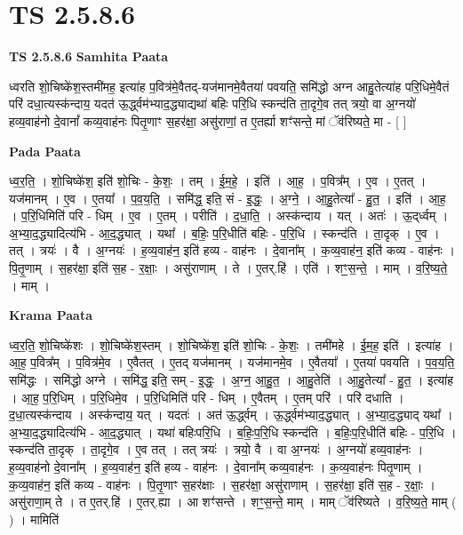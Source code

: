 \documentclass[17pt]{extarticle}
\begin{document}
\section*{ TS 2.5.8.6 }

\textbf{TS 2.5.8.6 } \newline
\textbf{Samhita Paata} \newline

ध्वरति शो॒चिष्के॑श॒स्तमी॑मह॒ इत्या॑ह प॒वित्र॑मे॒वैतद्-यज॑मानमे॒वैतया॑ पवयति॒ समि॑द्धो अग्न आहु॒तेत्या॑ह परि॒धिमे॒वैतं परि॑ दधा॒त्यस्क॑न्दाय॒ यदत॑ ऊ॒र्द्ध्वम॑भ्याद॒द्ध्याद्यथा॑ बहिः परि॒धि स्कन्द॑ति ता॒दृगे॒व तत् त्रयो॒ वा अ॒ग्नयो॑ हव्य॒वाह॑नो दे॒वानां᳚ कव्य॒वाह॑नः पितृ॒णाꣳ स॒हर॑क्षा॒ असु॑राणां॒ त ए॒तर्ह्या शꣳ॑सन्ते॒ मां ॅव॑रिष्यते॒ मा - [  ] \newline

\textbf{Pada Paata} \newline

ध्व॒र॒ति॒ । शो॒चिष्के॑श॒ इति॑ शो॒चिः - के॒शः॒ । तम् । ई॒म॒हे॒ । इति॑ । आ॒ह॒ । प॒वित्र᳚म् । ए॒व । ए॒तत् । यज॑मानम् । ए॒व । ए॒तया᳚ । प॒व॒य॒ति॒ । समि॑द्ध॒ इति॒ सं - इ॒द्धः॒ । अ॒ग्ने॒ । आ॒हु॒तेत्या᳚ - हु॒त॒ । इति॑ । आ॒ह॒ । प॒रि॒धिमिति॑ परि - धिम् । ए॒व । ए॒तम् । परीति॑ । द॒धा॒ति॒ । अस्क॑न्दाय । यत् । अतः॑ । ऊ॒द्‌र्ध्वम् । अ॒भ्या॒द॒द्ध्यादित्य॑भि - आ॒द॒द्ध्यात् । यथा᳚ । ब॒हिः॒ प॒रि॒धीति॑ बहिः - प॒रि॒धि । स्कन्द॑ति । ता॒दृक् । ए॒व । तत् । त्रयः॑ । वै । अ॒ग्नयः॑ । ह॒व्य॒वाह॑न॒ इति॑ हव्य - वाह॑नः । दे॒वाना᳚म् । क॒व्य॒वाह॑न॒ इति॑ कव्य - वाह॑नः । पि॒तृ॒णाम् । स॒हर॑क्षा॒ इति॑ स॒ह - र॒क्षाः॒ । असु॑राणाम् । ते । ए॒तर्.हि॑ । एति॑ । शꣳ॒॒स॒न्ते॒ । माम् । व॒रि॒ष्य॒ते॒ । माम् ।  \newline


\textbf{Krama Paata} \newline

ध्व॒र॒ति॒ शो॒चिष्के॑शः । शो॒चिष्के॑श॒स्तम् । शो॒चिष्के॑श॒ इति॑ शो॒चिः - के॒शः॒ । तमी॑महे । ई॒म॒ह॒ इति॑ । इत्या॑ह । आ॒ह॒ प॒वित्र᳚म् । प॒वित्र॑मे॒व । ए॒वैतत् । ए॒तद् यज॑मानम् । यज॑मानमे॒व । ए॒वैतया᳚ । ए॒तया॑ पवयति । प॒व॒य॒ति॒ समि॑द्धः । समि॑द्धो अग्ने । समि॑द्ध॒ इति॒ सम् - इ॒द्धः॒ । अ॒ग्न॒ आ॒हु॒त॒ । आ॒हु॒तेति॑ । आ॒हु॒तेत्या᳚ - हु॒त॒ । इत्या॑ह । आ॒ह॒ प॒रि॒धिम् । प॒रि॒धिमे॒व । प॒रि॒धिमिति॑ परि - धिम् । ए॒वैतम् । ए॒तम् परि॑ । परि॑ दधाति । द॒धा॒त्यस्क॑न्दाय । अस्क॑न्दाय॒ यत् । यदतः॑ । अत॑ ऊ॒र्द्ध्वम् । ऊ॒र्द्ध्वम॑भ्याद॒द्ध्यात् । अ॒भ्या॒द॒द्ध्याद् यथा᳚ । अ॒भ्या॒द॒द्ध्यादित्य॑भि - आ॒द॒द्ध्यात् । यथा॑ बहिःपरि॒धि । ब॒हिः॒प॒रि॒धि स्कन्द॑ति । ब॒हिः॒प॒रि॒धीति॑ बहिः - प॒रि॒धि । स्कन्द॑ति ता॒दृक् । ता॒दृगे॒व । ए॒व तत् । तत् त्रयः॑ । त्रयो॒ वै । वा अ॒ग्नयः॑ । अ॒ग्नयो॑ हव्य॒वाह॑नः । ह॒व्य॒वाह॑नो दे॒वाना᳚म् । ह॒व्य॒वाह॑न॒ इति॑ हव्य - वाह॑नः । दे॒वाना᳚म् कव्य॒वाह॑नः । क॒व्य॒वाह॑नः पितृ॒णाम् । क॒व्य॒वाह॑न॒ इति॑ कव्य - वाह॑नः । पि॒तृ॒णाꣳ स॒हर॑क्षाः । स॒हर॑क्षा॒ असु॑राणाम् । स॒हर॑क्षा॒ इति॑ स॒ह - र॒क्षाः॒ । असु॑राणा॒म् ते । त ए॒तर्.हि॑ । ए॒तर्.ह्या । आ शꣳ॑सन्ते । शꣳ॒॒स॒न्ते॒ माम् । माम् ॅव॑रिष्यते । व॒रि॒ष्य॒ते॒ माम् ( ) । मामिति॑ \newline
\end{document}
